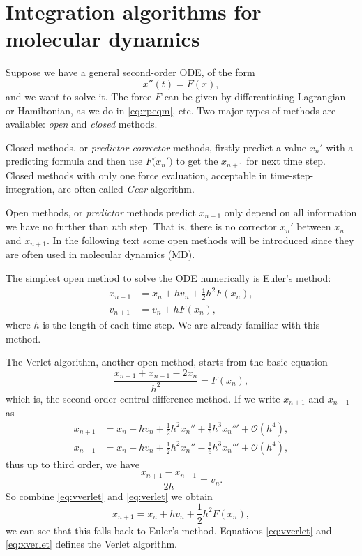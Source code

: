 
\section{Integration algorithms for molecular dynamics}
\label{sec:open}

Suppose we have a general second-order ODE, of the form
\begin{equation}
	x''(t) = F(x),
\end{equation}
and we want to solve it. The force $F$ can be given by differentiating Lagrangian or Hamiltonian, as we do in \eqref{eq:rpeqm}, etc. Two major types of methods are
available: \textit{open} and \textit{closed} methods.

Closed methods, or \textit{predictor-corrector} methods, firstly predict a value
$x_{n}'$ with a predicting formula and then use $F\big(x_{n}'\big)$ to get the $x_{n+1}$
for next time step. Closed methods with only one force evaluation, acceptable in time-step-integration,
are often called \textit{Gear} algorithm.

Open methods, or \textit{predictor} methods predict $x_{n+1}$ only depend on all
information we have no further than $n$th step. That is, there is no corrector $x_n'$ between
$x_{n}$ and $x_{n+1}$. In the following text some open methods will be introduced since
they are often used in molecular dynamics (MD).

The simplest  open method to solve the ODE numerically is Euler's method:
\begin{subequations}
	\begin{align}
		x_{n+1} & = x_n + h v_n + \frac{ 1 }{ 2 } h^2 F(x_n), \\
		v_{n+1} & = v_n + h F(x_n),
	\end{align}
\end{subequations}
where $h$ is the length of each time step. We are already familiar with this method.

The Verlet algorithm, another open method, starts from the basic equation
\begin{equation}\label{eq:verlet}
	\frac{ x_{n+1} + x_{n-1} - 2 x_n }{ h^2 } = F(x_n),
\end{equation}
which is, the second-order central difference method.
If we write $x_{n+1}$ and $x_{n-1}$ as
\begin{align}
	x_{n+1} & = x_n + h v_n + \frac{ 1 }{ 2 } h^2 x_n'' + \frac{ 1 }{ 6 } h^3 x_n''' + \mathcal{O}(h^4), \\
	x_{n-1} & = x_n - h v_n + \frac{ 1 }{ 2 } h^2 x_n'' - \frac{ 1 }{ 6 } h^3 x_n''' + \mathcal{O}(h^4),
\end{align}
thus up to third order, we have
\begin{equation}\label{eq:vverlet}
	\frac{x_{n+1} - x_{n-1}}{2h} =  v_n.
\end{equation}
So combine \eqref{eq:vverlet} and \eqref{eq:verlet} we obtain
\begin{equation}\label{eq:xverlet}
	x_{n+1} = x_{n} + h v_{n} + \frac{ 1 }{ 2 } h^2 F(x_n),
\end{equation}
we can see that this falls back to Euler's method. Equations
\eqref{eq:vverlet} and \eqref{eq:xverlet} defines the Verlet algorithm.

